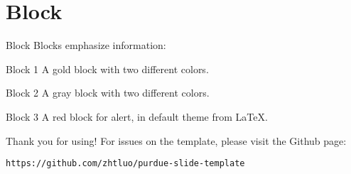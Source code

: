 \documentclass{purdue-slide}
\begin{document}
\section{Block}

\begin{frame}{Block}
    Blocks emphasize information:
    \begin{block}{Block 1}
    A gold block with two different colors.
    \end{block}
    \begin{exampleblock}{Block 2}
    A gray block with two different colors.
    \end{exampleblock}
    \begin{alertblock}{Block 3}
    A red block for alert, in default theme from \LaTeX.
    \end{alertblock}
\end{frame}

\begin{titleframe}{Thank you for using!}
    For issues on the template, please visit the Github page:
    
    \texttt{https://github.com/zhtluo/purdue-slide-template}
\end{titleframe}
\end{document}

